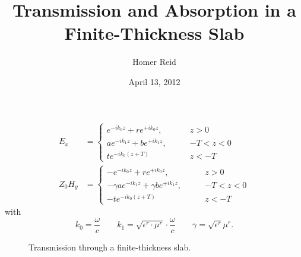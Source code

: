 \documentclass[letterpaper]{article}
\title {Transmission and Absorption in a Finite-Thickness Slab}
\author {Homer Reid}
\date {April 13, 2012}
\begin{document}
\pagestyle{myheadings}
\maketitle


\begin{align*} 
 E_x 
&= 
 \begin{cases}
  e^{-ik_0 z} + re^{+ik_0 z},  \qquad &z>0 \\
  ae^{-ik_1 z} + be^{+ik_1 z}, \qquad &-T< z< 0 \\
  te^{-ik_0 (z+T)}             \qquad &z<-T
 \end{cases}
\\
 Z_0 H_y 
&= 
 \begin{cases}
  -e^{-ik_0 z} + re^{+ik_0 z},                  \qquad &z>0 \\
  -\gamma a e^{-ik_1 z} + \gamma be^{+ik_1 z},  \qquad &-T< z< 0 \\
  -te^{-ik_0 (z+T)}                             \qquad &z<-T
 \end{cases}
\end{align*} 
with
$$ k_0=\frac{\omega}{c} 
   \qquad 
   k_1 = \sqrt{\epsilon^r \cdot \mu^r} \cdot \frac{\omega}{c} 
   \qquad 
   \gamma = \sqrt{\epsilon^r}{\mu^r}.
$$ 

\begin{figure}[h]
\begin{center}
\label{SlabCartoon}
\caption{Transmission through a finite-thickness slab.}
\end{center}
\end{figure}
\end{document}
